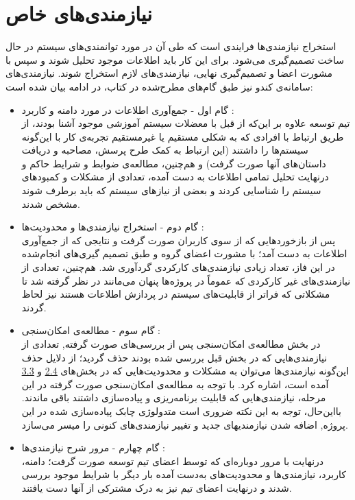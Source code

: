 \documentclass{report}
\begin{document}
\section{نیازمندی‌های خاص}
استخراج نیازمندی‌ها فرایندی است که طی آن در مورد توانمندی‌های سیستم در حال ساخت تصمیم‌گیری می‌شود. برای این کار باید اطلاعات موجود تحلیل شوند و سپس با مشورت اعضا و تصمیم‌گیری نهایی، نیازمندی‌های لازم استخراج شوند. نیازمندی‌های سامانه‌ی کندو نیز طبق گام‌های مطرح‌شده در کتاب، در ادامه بیان شده است:
\begin{itemize}
\item
گام اول - جمع‌آوری اطلاعات در مورد دامنه و کاربرد :\\
تیم توسعه علاوه بر این‌که از قبل با معضلات سیستم آموزشی موجود آشنا بودند، از طریق ارتباط با افرادی که به شکلی مستقیم یا غیرمستقیم تجربه‌ی کار با این‌گونه سیستم‌ها را داشتند (این ارتباط به کمک طرح پرسش، مصاحبه و دریافت داستان‌های آنها صورت گرفت) و هم‌چنین، مطالعه‌ی ضوابط و شرایط حاکم و درنهایت تحلیل تمامی اطلاعات به دست آمده، تعدادی از مشکلات و کمبودهای سیستم را شناسایی کردند و بعضی از نیازهای سیستم که باید برطرف شوند مشخص شدند.
\item
گام دوم - استخراج نیازمندی‌ها و محدودیت‌ها :\\
پس از بازخوردهایی که از سوی کاربران صورت گرفت و نتایجی که از جمع‌آوری اطلاعات به دست آمد؛ با مشورت اعضای گروه و طبق تصمیم گیری‌های انجام‌شده در این فاز، تعداد زیادی نیازمندی‌های کارکردی گردآوری شد. هم‌چنین، تعدادی از نیازمندی‌های غیر کارکردی که عموماً در پروژه‌ها پنهان می‌مانند در نظر گرفته شد تا مشکلاتی که فراتر از قابلیت‌های سیستم در پردازش اطلاعات هستند نیز لحاظ گردند.
\item
گام سوم - مطالعه‌ی امکان‌سنجی :\\
در بخش مطالعه‌ی امکان‌سنجی پس از بررسی‌های صورت گرفته, تعدادی از نیازمندی‌هایی که در بخش قبل بررسی شده بودند حذف گردید؛ از دلایل حذف این‌گونه نیازمندی‌ها می‌توان به مشکلات و محدودیت‌هایی که در بخش‌های
\hyperlink{tt}{\underline{2.4}} 
 و
 \hyperlink{gg}{\underline{3.3}}
 آمده است، اشاره کرد. با توجه به مطالعه‌ی امکان‌سنجی صورت گرفته در این مرحله، نیازمندی‌هایی که قابلیت برنامه‌ریزی و پیاده‌سازی داشتند باقی ماندند. بااین‌حال، توجه به این نکته ضروری است متدولوژی چابک پیاده‌سازی شده در این پروژه, اضافه شدن نیازمندیهای جدید و تغییر نیازمندی‌های کنونی را میسر می‌سازد.
\item
گام چهارم - مرور شرح نیازمندی‌ها :\\
درنهایت با مرور دوباره‌ای که توسط اعضای تیم توسعه صورت گرفت؛ دامنه، کاربرد،  نیازمندی‌ها و محدودیت‌های به‌دست آمده بار دیگر با شرایط موجود بررسی شدند و درنهایت اعضای تیم نیز به درک مشترکی از آنها دست یافتند.
\end{itemize}
\end{document}
